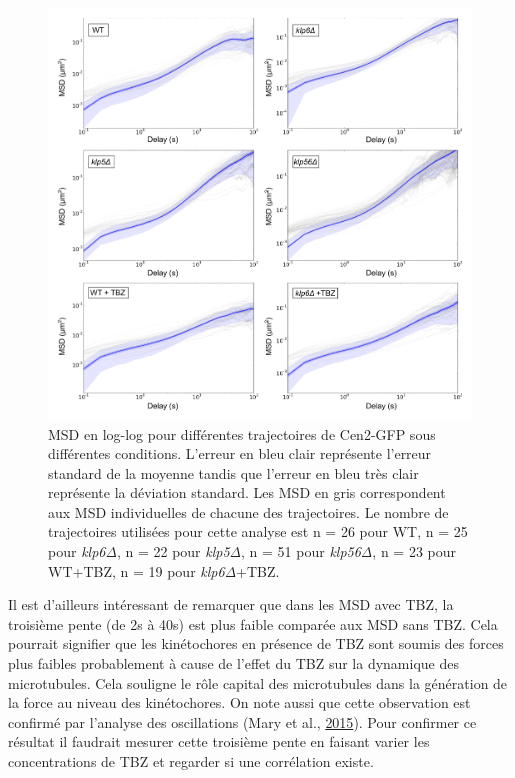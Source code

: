 \documentclass[12pt,a4paper,twoside,openright]{book}
\begin{document}
\begin{figure}[htbp]
\centering
\includegraphics{figures/results/imaging/msds_log.png}
\caption{\label{fig:msds-log}MSD en log-log pour différentes
trajectoires de Cen2-GFP sous différentes conditions. L'erreur en bleu
clair représente l'erreur standard de la moyenne tandis que l'erreur en
bleu très clair représente la déviation standard. Les MSD en gris
correspondent aux MSD individuelles de chacune des trajectoires. Le
nombre de trajectoires utilisées pour cette analyse est n = 26 pour WT,
n = 25 pour \emph{klp6Δ}, n = 22 pour \emph{klp5Δ}, n = 51 pour
\emph{klp56Δ}, n = 23 pour WT+TBZ, n = 19 pour \emph{klp6Δ}+TBZ.}
\end{figure}

Il est d'ailleurs intéressant de remarquer que dans les MSD avec TBZ, la
troisième pente (de 2s à 40s) est plus faible comparée aux MSD sans TBZ.
Cela pourrait signifier que les kinétochores en présence de TBZ sont
soumis des forces plus faibles probablement à cause de l'effet du TBZ
sur la dynamique des microtubules. Cela souligne le rôle capital des
microtubules dans la génération de la force au niveau des kinétochores.
On note aussi que cette observation est confirmé par l'analyse des
oscillations (Mary et al., \protect\hyperlink{ref-Mary2015}{2015}). Pour
confirmer ce résultat il faudrait mesurer cette troisième pente en
faisant varier les concentrations de TBZ et regarder si une corrélation
existe.
\end{document}
